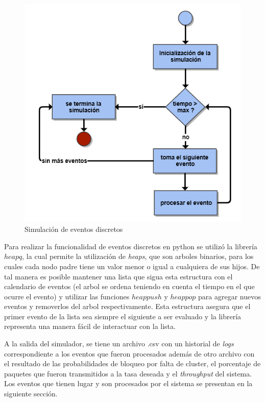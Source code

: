 \begin{figure}[th]
    \centering
    \includegraphics[scale=.7]{Figures/flowdes.png}
    \decoRule
    \caption[Simulación de eventos discretos]{Simulación de eventos discretos}
    \label{fig:flowdes}
\end{figure}

Para realizar la funcionalidad de eventos discretos en python se utilizó la librería $heapq$, la cual permite la utilización de \textit{heaps}, que son arboles binarios, para los cuales cada nodo padre tiene un valor menor o igual a cualquiera de sus hijos. De tal manera es posible mantener una lista que sigua esta estructura con el calendario de eventos (el arbol se ordena teniendo en cuenta el tiempo en el que ocurre el evento) y utilizar las funciones $heappush$ y $heappop$ para agregar nuevos eventos y removerlos del arbol respectivamente. Esta estructura asegura que el primer evento de la lista sea siempre el siguiente a ser evaluado y la librería representa una manera fácil de interactuar con la lista.\newline

A la salida del simulador, se tiene un archivo .csv con un historial de \textit{logs} correspondiente a los eventos que fueron procesados además de otro archivo con el resultado de las probabilidades de bloqueo por falta de cluster, el porcentaje de paquetes que fueron transmitidos a la tasa deseada y el \textit{throughput} del sistema. Los eventos que tienen lugar y son procesados por el sistema se presentan en la siguiente sección. \newline 

